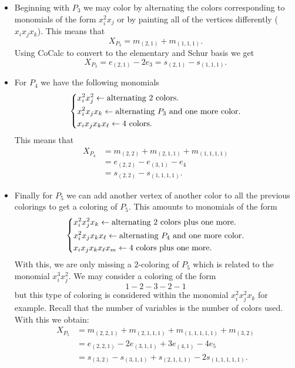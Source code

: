 \documentclass[12pt]{memoir}
\begin{document}
\begin{ptcbr}
\begin{enumerate}[i)]
    \begin{itemize}
        \item Beginning with $P_3$ we may color by alternating the colors corresponding to monomials of the form $x_i^2x_j$ or by painting all of the vertices differently ($x_ix_jx_k$). This means that 
        $$X_{P_3}=m_{(2,1)}+m_{(1,1,1)}.$$
        Using CoCalc to convert to the elementary and Schur basis we get 
        $$X_{P_3}=e_{(2,1)}-2e_{3}=s_{(2,1)}-s_{(1,1,1)}.$$
        \item For $P_4$ we have the following monomials
        $$
        \left\lbrace
        \begin{aligned}
            &x_i^2x_j^2\leftarrow\text{alternating 2 colors.}\\
            &x_i^2x_jx_k\leftarrow\text{alternating }P_3\ \text{and one more color.}\\
            &x_ix_jx_kx_\ell\leftarrow\text{4 colors.}
        \end{aligned}
        \right.
        $$
        This means that 
        \begin{align*}
        X_{P_4}&=m_{(2,2)}+m_{(2,1,1)}+m_{(1,1,1,1)}\\
        &=e_{(2,2)}-e_{(3,1)}-e_4\\
        &=s_{(2,2)}-s_{(1,1,1,1)}.
        \end{align*}
        \item Finally for $P_5$ we can add another vertex of another color to all the previous colorings to get a coloring of $P_5$. This amounts to monomials of the form
        $$
        \left\lbrace
        \begin{aligned}
            &x_i^2x_j^2x_k\leftarrow\text{alternating 2 colors plus one more.}\\
            &x_i^2x_jx_kx_\l\leftarrow\text{alternating }P_4\ \text{and one more color.}\\
            &x_ix_jx_kx_\l x_m\leftarrow\text{4 colors plus one more.}
        \end{aligned}
        \right.
        $$
        With this, we are only missing a $2$-coloring of $P_5$ which is related to the monomial $x_i^3x_j^2$. We may consider a coloring of the form 
        $$1-2-3-2-1$$
        but this type of coloring is considered within the monomial $x_i^2x_j^2x_k$ for example. Recall that the number of variables is the number of colors used. With this we obtain:
        \begin{align*}
            X_{P_5}&=m_{(2,2,1)}+m_{(2,1,1,1)}+m_{(1,1,1,1,1)}+m_{(3,2)}\\
            &=e_{(2,2,1)}-2e_{(3,1,1)}+3e_{(4,1)}-4e_5\\
            &=s_{(3,2)}-s_{(3,1,1)}+s_{(2,1,1,1)}-2s_{(1,1,1,1,1)}.
            \end{align*}
    \end{itemize}
    \end{enumerate}
\end{ptcbr}
\end{document}
